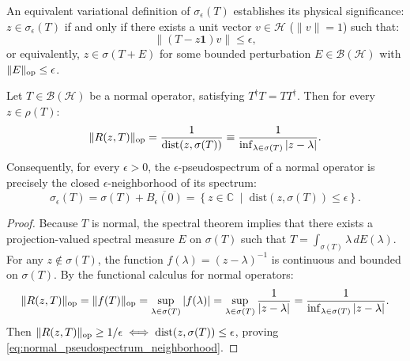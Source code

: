 An equivalent variational definition of $\sigma_\epsilon(T)$ establishes its physical significance: $z \in \sigma_\epsilon(T)$ if and only if there exists a unit vector $v \in \mathcal{H}$ ($\|v\| = 1$) such that:
\begin{equation}
\label{eq:pseudoeigenvector_def}
\|(T - z \mathbf{1}) v\| \le \epsilon,
\end{equation}
or equivalently, $z \in \sigma(T + E)$ for some bounded perturbation $E \in \mathcal{B}(\mathcal{H})$ with $\|E\|_{\mathrm{op}} \le \epsilon$.

\begin{proposition}
\label{prop:normal_pseudospectra}
Let $T \in \mathcal{B}(\mathcal{H})$ be a normal operator, satisfying $T^\dagger T = T T^\dagger$. Then for every $z \in \rho(T)$:
\begin{equation}
\label{eq:normal_resolvent_norm}
\|R(z, T)\|_{\mathrm{op}} = \frac{1}{\mathrm{dist}(z, \sigma(T))} \equiv \frac{1}{\inf_{\lambda \in \sigma(T)} |z - \lambda|}.
\end{equation}
Consequently, for every $\epsilon > 0$, the $\epsilon$-pseudospectrum of a normal operator is precisely the closed $\epsilon$-neighborhood of its spectrum:
\begin{equation}
\label{eq:normal_pseudospectrum_neighborhood}
\sigma_\epsilon(T) = \sigma(T) + \overline{B_\epsilon(0)} = \left\{ z \in \mathbb{C} \;\middle|\; \mathrm{dist}(z, \sigma(T)) \le \epsilon \right\}.
\end{equation}
\end{proposition}

\begin{proof}
Because $T$ is normal, the spectral theorem implies that there exists a projection-valued spectral measure $E$ on $\sigma(T)$ such that $T = \int_{\sigma(T)} \lambda \, dE(\lambda)$. For any $z \notin \sigma(T)$, the function $f(\lambda) = (z - \lambda)^{-1}$ is continuous and bounded on $\sigma(T)$. By the functional calculus for normal operators:
\begin{equation}
\|R(z, T)\|_{\mathrm{op}} = \|f(T)\|_{\mathrm{op}} = \sup_{\lambda \in \sigma(T)} |f(\lambda)| = \sup_{\lambda \in \sigma(T)} \frac{1}{|z - \lambda|} = \frac{1}{\inf_{\lambda \in \sigma(T)} |z - \lambda|}.
\end{equation}
Then $\|R(z, T)\|_{\mathrm{op}} \ge 1/\epsilon \iff \mathrm{dist}(z, \sigma(T)) \le \epsilon$, proving \eqref{eq:normal_pseudospectrum_neighborhood}.
\end{proof}

